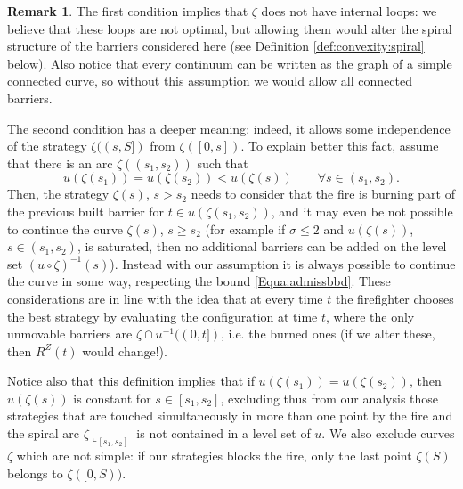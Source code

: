 \documentclass[reqno]{amsart}
\newcounter{assu}
\theoremstyle{definition} \newtheorem{definition}{Definition}[section]
\theoremstyle{definition} \newtheorem{remark}[definition]{Remark}
\theoremstyle{plain} \newtheorem{lemma}[definition]{Lemma}
\theoremstyle{plain} \newtheorem{proposition}[definition]{Proposition}
\theoremstyle{plain} \newtheorem{theorem}[definition]{Theorem}
\theoremstyle{plain} \newtheorem{corollary}[definition]{Corollary}
\theoremstyle{definition} \newtheorem{example}[definition]{Example}
\theoremstyle{plain} \newtheorem{claim}[clai]{Claim}
\theoremstyle{definition} \newtheorem{assumption}[definition]{Assumption}
\theoremstyle{definition} \newtheorem{observation}[definition]{Observation}
\newcommand{\1}{\mathbbm 1}
\newcommand{\rest}{\llcorner}
\numberwithin{equation}{section} %
\theoremstyle{plain} \newtheorem*{theorem*}{Theorem}
\theoremstyle{plain} \newtheorem{mthm}[maintheorem]{Main Theorem}
\theoremstyle{plain} \newtheorem*{mthm*}{Main Theorem}
\theoremstyle{plain} \newtheorem*{conjecture*}{Conjecture}
\theoremstyle{plain} \newtheorem{conjecture}[definition]{Conjecture}
\theoremstyle{plain} \newtheorem*{problem*}{Problem}
\begin{document}
\begin{remark}
\label{Rem:comment_single_curve}
The first condition implies that $\zeta$ does not have internal loops: we believe that these loops are not optimal, but allowing them would alter the spiral structure of the barriers considered here (see Definition \ref{def:convexity:spiral} below). Also notice that every continuum can be written as the graph of a simple connected curve, so without this assumption we would allow all connected barriers.

The second condition has a deeper meaning: indeed, it allows some independence of the strategy $\zeta((s,S])$ from $\zeta([0,s])$. To explain better this fact, assume that there is an arc $\zeta((s_1,s_2))$ such that
\begin{equation*}
u(\zeta(s_1)) = u(\zeta(s_2)) < u(\zeta(s)) \qquad \forall s \in (s_1,s_2).
\end{equation*}
Then, the strategy $\zeta(s)$, $s > s_2$ needs to consider that the fire is burning part of the previous built barrier for $t \in u(\zeta(s_1,s_2))$, and it may even be not possible to continue the curve $\zeta(s)$, $s \geq s_2$ (for example if $\sigma \leq 2$ and $u(\zeta(s))$, $s \in (s_1,s_2)$, is saturated, then no additional barriers can be added on the level set $(u \circ \zeta)^{-1}(s)$). Instead with our assumption it is always possible to continue the curve in some way, respecting the bound \eqref{Equa:admissbbd}. These considerations are in line with the idea that at every time $t$ the firefighter chooses the best strategy by evaluating the configuration at time $t$, where the only unmovable barriers are $\zeta \cap u^{-1}((0,t])$, i.e. the burned ones (if we alter these, then $R^Z(t)$ would change!).

Notice also that this definition implies that if $u(\zeta(s_1)) = u(\zeta(s_2))$, then $u(\zeta(s))$ is constant for $s \in [s_1,s_2]$, excluding thus from our analysis those strategies that are touched simultaneously in more than one point by the fire and the spiral arc $\zeta \rest_{[s_1,s_2]}$ is not contained in a level set of $u$. We also exclude curves $\zeta$ which are not simple: if our strategies blocks the fire, only the last point $\zeta(S)$ belongs to $\zeta([0,S))$.
%
\end{remark}
\end{document}

